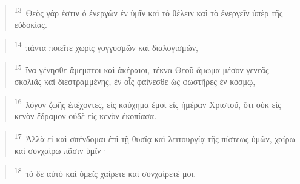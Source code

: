 \documentclass{article}
\newcommand{\currentverse}{1} %
\newcommand{\setcurrentverse}[1]{\renewcommand{\currentverse}{#1}}
\begin{document}
\begin{verse}

\setcurrentverse{13}

\setcounter{footnote}{0}

\textsuperscript{13}~Θεὸς γάρ ἐστιν ὁ ἐνεργῶν ἐν ὑμῖν καὶ τὸ θέλειν καὶ τὸ ἐνεργεῖν ὑπὲρ τῆς εὐδοκίας.

\end{verse}

\begin{verse}

\setcurrentverse{14}

\setcounter{footnote}{0}

\textsuperscript{14}~πάντα ποιεῖτε χωρὶς γογγυσμῶν καὶ διαλογισμῶν,

\end{verse}

\begin{verse}

\setcurrentverse{15}

\setcounter{footnote}{0}

\textsuperscript{15}~ἵνα γένησθε ἄμεμπτοι καὶ ἀκέραιοι, τέκνα Θεοῦ ἄμωμα μέσον γενεᾶς σκολιᾶς καὶ διεστραμμένης, ἐν οἷς φαίνεσθε ὡς φωστῆρες ἐν κόσμῳ,

\end{verse}

\begin{verse}

\setcurrentverse{16}

\setcounter{footnote}{0}

\textsuperscript{16}~λόγον ζωῆς ἐπέχοντες, εἰς καύχημα ἐμοὶ εἰς ἡμέραν Χριστοῦ, ὅτι οὐκ εἰς κενὸν ἔδραμον οὐδὲ εἰς κενὸν ἐκοπίασα.

\end{verse}

\begin{verse}

\setcurrentverse{17}

\setcounter{footnote}{0}

\textsuperscript{17}~Ἀλλὰ εἰ καὶ σπένδομαι ἐπὶ τῇ θυσίᾳ καὶ λειτουργίᾳ τῆς πίστεως ὑμῶν, χαίρω καὶ συνχαίρω πᾶσιν ὑμῖν·

\end{verse}

\begin{verse}

\setcurrentverse{18}

\setcounter{footnote}{0}

\textsuperscript{18}~τὸ δὲ αὐτὸ καὶ ὑμεῖς χαίρετε καὶ συνχαίρετέ μοι.

\end{verse}
\end{document}
